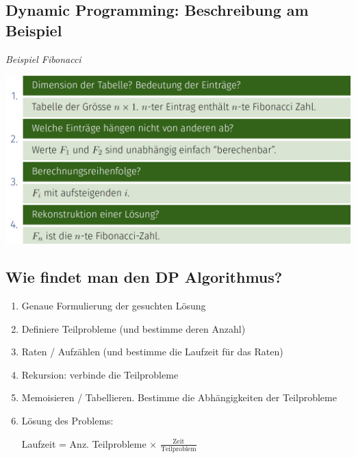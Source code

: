 \vspace{-4pt}
\begin{sectionbox}
\subsection{Dynamic Programming: Beschreibung am Beispiel}\smallskip

\textit{Beispiel Fibonacci}\par
\begin{center}
    \includegraphics[width = \columnwidth]{../img/DPtable.png}
\end{center}\smallskip

\end{sectionbox}
\vspace{-4pt}
\begin{sectionbox}
\subsection{Wie findet man den DP Algorithmus?}\smallskip
\begin{enumerate}
    \item Genaue Formulierung der gesuchten Lösung
    \item Definiere Teilprobleme (und bestimme deren Anzahl)
    \item Raten / Aufzählen (und bestimme die Laufzeit für das Raten)
    \item Rekursion: verbinde die Teilprobleme
    \item Memoisieren / Tabellieren. Bestimme die Abhängigkeiten der Teilprobleme
    \item Lösung des Problems: \par Laufzeit = Anz. Teilprobleme $\times$ $\frac{\text{Zeit}}{\text{Teilproblem}}$
\end{enumerate}

\end{sectionbox}
